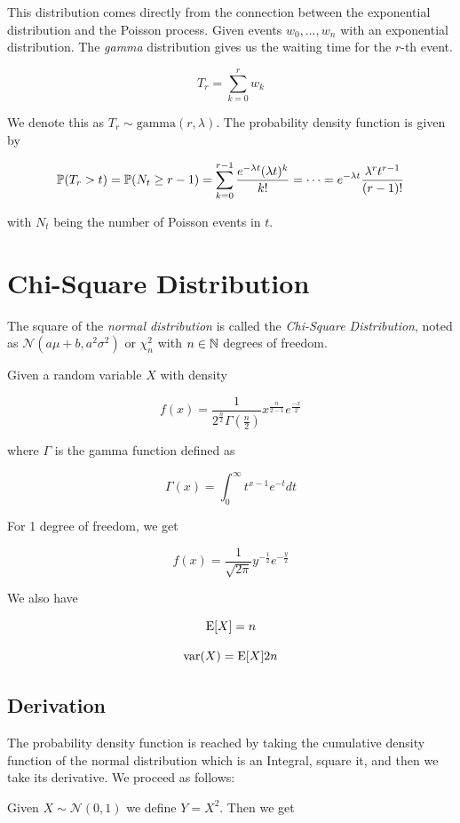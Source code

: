 This distribution comes directly from the connection between the exponential distribution and the Poisson process.
Given events \(w_0, \dots, w_n\) with an exponential distribution. The \emph{gamma} distribution gives us the waiting time 
for the \(r\)-th event. 

\[
    T_r = \sum_{k = 0}^{r} w_k 
\]

We denote this as \(T_r \sim \mathrm{gamma}(r, \lambda)\). The probability density function is given by 

\[
    \mathbb{P}(T_r > t) = \mathbb{P}(N_t \ge r - 1) = \sum_{k = 0}^{r - 1} \frac{e^{-\lambda t}(\lambda t)^k}{k!} = \cdots = e^{-\lambda t}\frac{\lambda^r t^{r - 1}}{(r - 1)!}
\]

with \(N_t\) being the number of Poisson events in \(t\).

\section{Chi-Square Distribution}

The square of the \emph{normal distribution} is called the \emph{Chi-Square Distribution}, noted as \(\mathcal{N}(a\mu + b, a^2 \sigma^2)\) or \(\chi^2_n\) 
with \(n \in \mathbb{N}\) degrees of freedom.

Given a random variable \(X\) with density 

\[
    f(x) = \frac{1}{2^{\frac{n}{2}} \Gamma \left(\frac{n}{2}\right)} x^{\frac{n}{2 - 1}}e^{\frac{-x}{2}}
\]

where \(\Gamma\) is the gamma function defined as

\[
    \Gamma (x) = \int_{0}^{\infty} t^{x - 1} e^{-t} dt
\]

For 1 degree of freedom, we get 

\[
    f(x) = \frac{1}{\sqrt{2\pi}} y^{-\frac{1}{2}} e^{-\frac{y}{2}}
\]

We also have 

\[
    \mathrm{E}[X] = n
\]
    
\[
    \mathrm{var}(X) = \mathrm{E}[X] 2n
\]

\subsection{Derivation}

The probability density function is reached by taking the cumulative density function of the normal distribution which is 
an Integral, square it, and then we take its derivative. We proceed as follows:

Given \(X \sim \mathcal{N}(0,1)\) we define \(Y = X^2\). Then we get 

